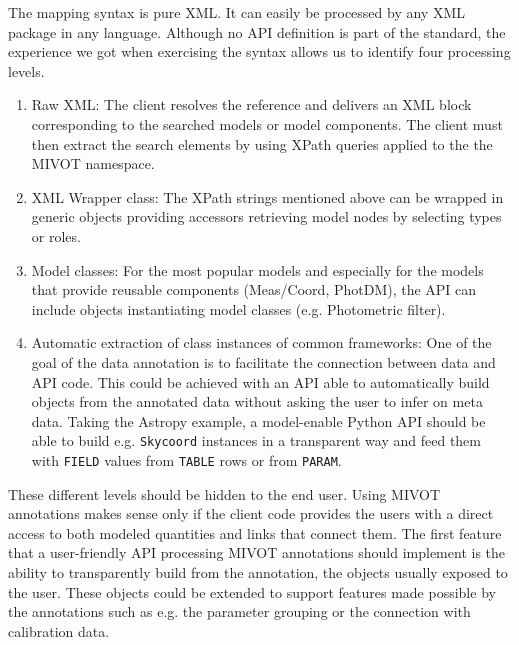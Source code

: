 The mapping syntax is pure XML. It can easily be processed by any XML package in any language.
Although no API definition is part of the standard, the experience we got when exercising the syntax allows us to identify 
four processing levels.

\begin{enumerate} 
  \item Raw XML: The client resolves the reference and delivers an XML block corresponding to the searched models or model components. 
        The client must then extract the search elements by using XPath queries applied to the the MIVOT namespace.
  \item XML Wrapper class: The XPath strings mentioned above can be wrapped in generic objects providing 
        accessors retrieving model nodes by selecting types or roles. 
  \item Model classes: For the most popular models and especially for the models that provide reusable 
        components (Meas/Coord, PhotDM), the API can include objects instantiating model classes (e.g. Photometric filter).
  \item Automatic extraction of class instances of common frameworks: One of the goal of the data annotation is to 
        facilitate the connection between data and API code. This could be achieved with an API able to automatically 
        build objects from the annotated data without asking the user to infer on meta data. Taking the Astropy example, 
        a model-enable Python API should be able to build e.g. \texttt{Skycoord} instances in a transparent way and 
        feed them with \texttt{FIELD} values from \texttt{TABLE} rows or from \texttt{PARAM}.
 \end{enumerate}

These different levels should be hidden to the end user. Using MIVOT annotations makes sense only if the client code provides 
the users with a direct access to both modeled quantities and links that connect them. 
The first feature that a user-friendly API processing MIVOT annotations should implement is the ability 
to transparently build from the annotation, the objects usually exposed to the user. 
These objects could be extended to support features made 
possible by the annotations such as e.g. the parameter grouping or the connection with calibration data.
